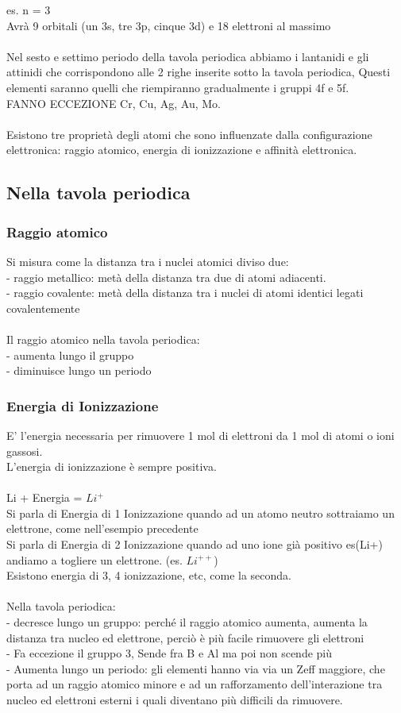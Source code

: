 es. n = 3\\
Avrà 9 orbitali (un 3s, tre 3p, cinque 3d) e 18 elettroni al massimo\\\\
Nel sesto e settimo periodo della tavola periodica abbiamo i lantanidi e gli attinidi che corrispondono alle 2 righe inserite sotto la tavola periodica, Questi elementi saranno quelli che riempiranno gradualmente i gruppi 4f e 5f.\\
FANNO ECCEZIONE Cr, Cu, Ag, Au, Mo.\\\\
Esistono tre proprietà degli atomi che sono influenzate dalla configurazione elettronica: raggio atomico, energia di ionizzazione e affinità elettronica.
\subsection{Nella tavola periodica}
\subsubsection{Raggio atomico}
Si misura come la distanza tra i nuclei atomici diviso due:\\
\tab- raggio metallico: metà della distanza tra due di atomi adiacenti.\\
\tab- raggio covalente: metà della distanza tra i nuclei di atomi identici legati covalentemente\\\\
Il raggio atomico nella tavola periodica:\\
\tab- aumenta lungo il gruppo\\
\tab- diminuisce lungo un periodo
\subsubsection{Energia di Ionizzazione}
E’ l’energia necessaria per rimuovere 1 mol di elettroni da 1 mol di atomi o ioni gassosi.\\
L’energia di ionizzazione è sempre positiva.\\\\
Li + Energia = $Li^+$\\
Si parla di Energia di 1 Ionizzazione quando ad un atomo neutro sottraiamo un elettrone, come nell’esempio precedente\\
Si parla di Energia di 2 Ionizzazione quando ad uno ione già positivo es(Li+) andiamo a togliere un elettrone. (es. $Li^{++}$)\\
Esistono energia di 3, 4 ionizzazione, etc, come la seconda.\\\\
Nella tavola periodica:\\
\tab- decresce lungo un gruppo: perché il raggio atomico aumenta, aumenta la distanza tra nucleo ed elettrone, perciò è più facile rimuovere gli elettroni\\
\tab\tab- Fa eccezione il gruppo 3, Sende fra B e Al ma poi non scende più\\
\tab- Aumenta lungo un periodo: gli elementi hanno via via un Zeff maggiore, che porta ad un raggio atomico minore e ad un rafforzamento dell’interazione tra nucleo ed elettroni esterni i quali diventano più difficili da rimuovere. 
